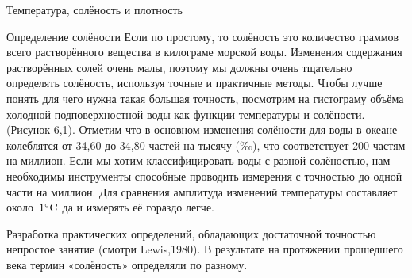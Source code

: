 \begin{chapter}{Температура, солёность и плотность}
\begin{section}{Определение солёности}
Если по простому, то солёность это количество граммов всего
растворённого вещества в килограме морской воды. Изменения содержания
растворённых солей очень малы, поэтому мы должны очень тщательно
определять солёность, используя точные и практичные методы. Чтобы
лучше понять для чего нужна такая большая точность, посмотрим на
гистограму объёма холодной подповерхностной воды как функции
температуры и солёности. (Рисунок 6,1). Отметим что в основном
изменения солёности для воды в океане колеблятся от 34,60 до 34,80
частей на тысячу (‰), что соответствует 200 частям на миллион. Если
мы хотим классифицировать воды с разной солёностью, нам необходимы
инструменты способные проводить измерения с точностью до одной части
на миллион. Для сравнения амплитуда изменений температуры составляет
около~${1}^\circ\mbox{C}$ да и измерять её гораздо легче.
%


Разработка практических определений, обладающих достаточной точностью
непростое занятие (смотри Lewis,1980). В результате на протяжении
прошедшего века термин «солёность» определяли по разному.
%


\end{section}
\end{chapter}
